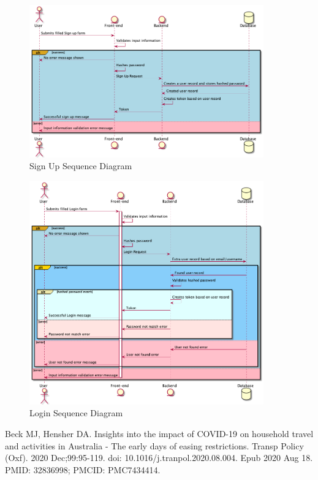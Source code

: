 \documentclass[12pt]{article}
\begin{document}
  \begin{figure}[htp]
    \centering
  \includegraphics[width=0.9\textwidth]{Sign Up Sequence Diagram.png}
  
  \caption{Sign Up Sequence Diagram}
  \end{figure}

  \begin{figure}[htp]
    \centering
  \includegraphics[width=0.9\textwidth]{Login Sequence Diagram.png}
  
  \caption{Login Sequence Diagram}
  \end{figure}


\begin{thebibliography}{9}
  Beck MJ, Hensher DA. Insights into the impact of COVID-19 on household travel and activities in Australia - The early days of easing restrictions. Transp Policy (Oxf). 2020 Dec;99:95-119. doi: 10.1016/j.tranpol.2020.08.004. Epub 2020 Aug 18. PMID: 32836998; PMCID: PMC7434414.
\end{thebibliography}
\end{document}
